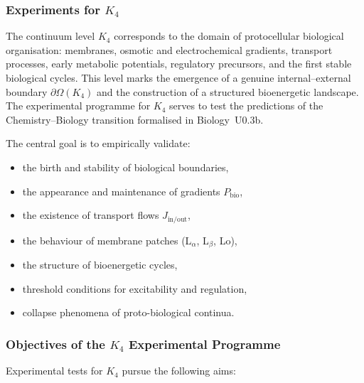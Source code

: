 
\subsubsection{Experiments for \texorpdfstring{$K_4$}{K_4}}
\label{sec:experiments-k4}

The continuum level $K_4$ corresponds to the domain of protocellular
biological organisation: membranes, osmotic and electrochemical
gradients, transport processes, early metabolic potentials,
regulatory precursors, and the first stable biological cycles.
This level marks the emergence of a genuine internal–external
boundary $\partial\Omega(K_4)$ and the construction of a structured
bioenergetic landscape.
The experimental programme for $K_4$ serves to test the
predictions of the Chemistry--Biology transition formalised in
Biology~U0.3b.

The central goal is to empirically validate:

\begin{itemize}
    \item the birth and stability of biological boundaries,
    \item the appearance and maintenance of gradients $P_{\mathrm{bio}}$,
    \item the existence of transport flows $J_{\mathrm{in/out}}$,
    \item the behaviour of membrane patches (L$_\alpha$, L$_\beta$, Lo),
    \item the structure of bioenergetic cycles,
    \item threshold conditions for excitability and regulation,
    \item collapse phenomena of proto-biological continua.
\end{itemize}



\subsubsection{Objectives of the \texorpdfstring{$K_4$}{K_4} Experimental Programme}

Experimental tests for $K_4$ pursue the following aims:

